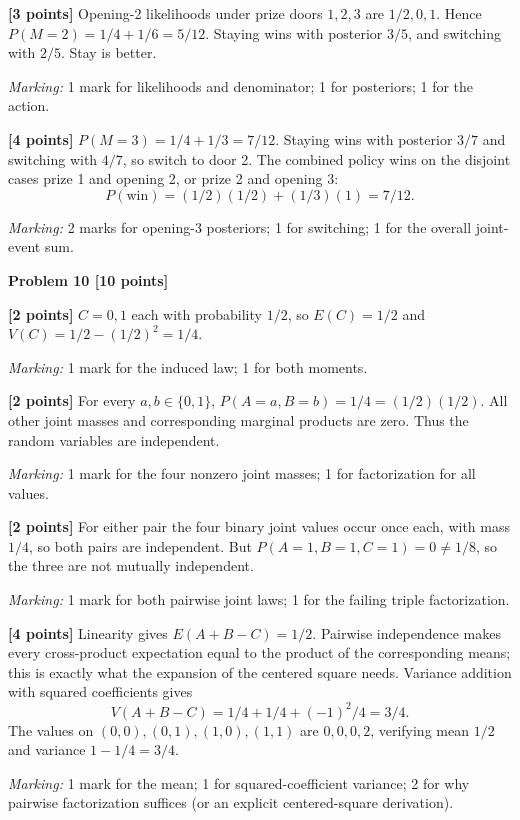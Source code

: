 \documentclass[12pt,letterpaper]{article}
\newcommand{\problemheading}[2][5\baselineskip]{\Needspace{#1}\par\noindent\hspace*{-0.625in}\textbf{#2}\par\nobreak\vspace{0.3em}}
\begin{document}
\begin{description}[font=\normalfont,leftmargin=1.2em,labelsep=0.4em]
\item[(a)] \textbf{[3 points]} Opening-2 likelihoods under prize doors $1,2,3$ are $1/2,0,1$. Hence $P(M=2)=1/4+1/6=5/12$. Staying wins with posterior $3/5$, and switching with $2/5$. Stay is better.
\par\textit{Marking:} 1 mark for likelihoods and denominator; 1 for posteriors; 1 for the action.
\item[(b)] \textbf{[4 points]} $P(M=3)=1/4+1/3=7/12$. Staying wins with posterior $3/7$ and switching with $4/7$, so switch to door 2. The combined policy wins on the disjoint cases prize 1 and opening 2, or prize 2 and opening 3:\[P(\text{win})=(1/2)(1/2)+(1/3)(1)=7/12.\]
\par\textit{Marking:} 2 marks for opening-3 posteriors; 1 for switching; 1 for the overall joint-event sum.
\end{description}
\vspace{0.65em}
\problemheading[\dimexpr 3\baselineskip+4\baselineskip\relax]{Problem 10 [10 points]}
\begin{description}[font=\normalfont,leftmargin=1.2em,labelsep=0.4em]
\item[(a)] \textbf{[2 points]} $C=0,1$ each with probability $1/2$, so $E(C)=1/2$ and $V(C)=1/2-(1/2)^2=1/4$.
\par\textit{Marking:} 1 mark for the induced law; 1 for both moments.
\item[(b)] \textbf{[2 points]} For every $a,b\in\{0,1\}$, $P(A=a,B=b)=1/4=(1/2)(1/2)$. All other joint masses and corresponding marginal products are zero. Thus the random variables are independent.
\par\textit{Marking:} 1 mark for the four nonzero joint masses; 1 for factorization for all values.
\item[(c)] \textbf{[2 points]} For either pair the four binary joint values occur once each, with mass $1/4$, so both pairs are independent. But $P(A=1,B=1,C=1)=0\ne1/8$, so the three are not mutually independent.
\par\textit{Marking:} 1 mark for both pairwise joint laws; 1 for the failing triple factorization.
\item[(d)] \textbf{[4 points]} Linearity gives $E(A+B-C)=1/2$. Pairwise independence makes every cross-product expectation equal to the product of the corresponding means; this is exactly what the expansion of the centered square needs. Variance addition with squared coefficients gives\[V(A+B-C)=1/4+1/4+(-1)^2/4=3/4.\]The values on $(0,0),(0,1),(1,0),(1,1)$ are $0,0,0,2$, verifying mean $1/2$ and variance $1-1/4=3/4$.
\par\textit{Marking:} 1 mark for the mean; 1 for squared-coefficient variance; 2 for why pairwise factorization suffices (or an explicit centered-square derivation).
\end{description}
\end{document}
